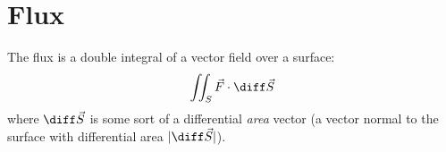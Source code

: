 \documentclass{multi}
\begin{document}
\section*{Flux}

The flux is a double integral of a vector field over a surface:
\[
    \iint_S \vec F \cdot \diff \vec S
\]
where \(\diff \vec S\) is some sort of a differential \emph{area} vector (a
vector normal to the surface with differential area \(|\diff \vec S|\)).
\begin{center}
  
\end{center}

\end{document}
